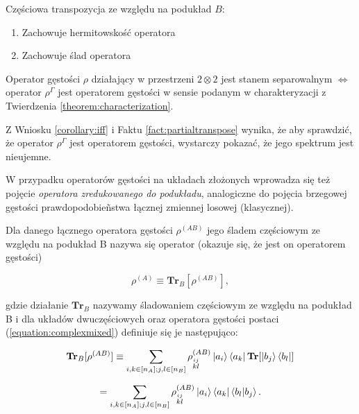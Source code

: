 \begin{fact}
    \label{fact:partialtranspose}
    Częściowa transpozycja ze względu na podukład $B$:

    \begin{enumerate}
        \item Zachowuje hermitowskość operatora
        \item Zachowuje ślad operatora
    \end{enumerate}
\end{fact}

\begin{theorem}
    \label{theorem:ppt}
    Operator gęstości $\rho$ działający w przestrzeni $2 \otimes 2$ jest stanem separowalnym $\Longleftrightarrow$ operator $\rho ^ {\Gamma}$ jest operatorem gęstości w sensie podanym w charakteryzacji z Twierdzenia \ref{theorem:characterization}.
\end{theorem}

\begin{fact}
    Z Wniosku \ref{corollary:iff} i Faktu \ref{fact:partialtranspose} wynika, że aby sprawdzić, że operator $\rho ^ {\Gamma}$ jest operatorem gęstości, wystarczy pokazać, że jego spektrum jest nieujemne.
\end{fact}

W przypadku operatorów gęstości na układach złożonych wprowadza się też pojęcie \textit{operatora zredukowanego do podukładu}, analogiczne do pojęcia brzegowej gęstości prawdopodobieñstwa łącznej zmiennej losowej (klasycznej).

\begin{definition}
    Dla danego łącznego operatora gęstości $\rho ^ {(AB)}$ jego śladem częściowym ze względu na podukład B nazywa się operator (okazuje się, że jest on operatorem gęstości)

    \begin{equation}
        \label{equation:partialtrace}
        \rho ^ {(A)} \equiv \textbf{Tr}_B[\rho ^ {(AB)}],
    \end{equation}

    gdzie działanie $\textbf{Tr}_B$ nazywamy śladowaniem częściowym ze względu na podukład B i dla układów dwuczęściowych oraz operatora gęstości postaci (\ref{equation:complexmixed}) definiuje się je następująco:

    $$
        \textbf{Tr}_{B}[\rho ^ {(AB)}] \equiv \sum\limits_{i, k \in [n_{A}]; j, l \in [n_{B}]} \rho_{\stackrel{ij}{kl}} ^ {(AB)} \ket{a_{i}} \bra{a_{k}} \textbf{Tr}[\ket{b_{j}} \bra{b_{l}}]
    $$

    \begin{equation}
        \label{equation:partial}
        = \sum\limits_{i, k \in [n_{A}]; j, l \in [n_{B}]} \rho_{\stackrel{ij}{kl}} ^ {(AB)} \ket{a_{i}} \bra{a_{k}} \bra{b_{l}}\ket{b_{j}}.
    \end{equation}
\end{definition}

